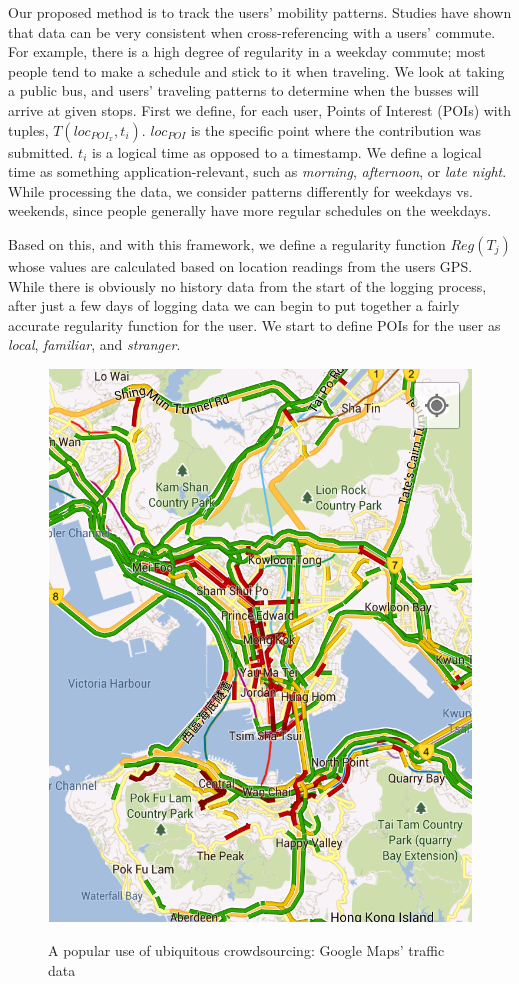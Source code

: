 \documentclass[9pt,twocolumn]{article}
\begin{document}
	Our proposed method is to track the users' mobility patterns. Studies have shown that data can be very consistent when cross-referencing with a users' commute. For example, there is a high degree of regularity in a weekday commute; most people tend to make a schedule and stick to it when traveling. \cite{rhee2011levy}
	We look at taking a public bus, and users' traveling patterns to determine when the busses will arrive at given stops. First we define, for each user, Points of Interest (POIs) with tuples, $T(loc_{POI_x}, t_i)$. $loc_{POI}$ is the specific point where the contribution was submitted. $t_i$ is a logical time as opposed to a timestamp. We define a logical time as something application-relevant, such as \emph{morning}, \emph{afternoon}, or \emph{late night}.
	While processing the data, we consider patterns differently for weekdays vs. weekends, since people generally have more regular schedules on the weekdays.
	
	Based on this, and with this framework, we define a regularity function $Reg(T_j)$ whose values are calculated based on location readings from the users GPS.
	While there is obviously no history data from the start of the logging process, after just a few days of logging data we can begin to put together a fairly accurate regularity function for the user. We start to define POIs for the user as \emph{local}, \emph{familiar}, and \emph{stranger}. 
	
	\begin{figure}
		\centering \includegraphics[width=0.7\columnwidth]{maps-traffic}
		\label{fig-traffic}
		\caption{A popular use of ubiquitous crowdsourcing: Google Maps' traffic data}
	\end{figure}
	
\end{document}
